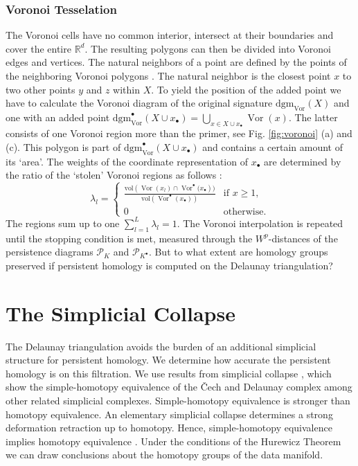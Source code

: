 \documentclass[runningheads]{llncs}
\DeclareMathOperator{\Vor}{\text{Vor}}
\begin{document}
\subsubsection{Voronoi Tesselation}
The Voronoi cells have no common interior, intersect at their boundaries and cover the entire $\mathbb{R}^d$. The resulting polygons can then be divided into Voronoi edges and vertices. The natural neighbors of a point are defined by the points of the neighboring Voronoi polygons \cite{Sibson}. The natural neighbor is the closest point $x$ to two other points $y$ and $z$ within $X$. To yield the position of the added point we have to calculate the Voronoi diagram of the original signature $\text{dgm}_{\Vor}(X)$ and one with an added point $\text{dgm}_{\Vor}^{\bullet}(X\cup x_{\bullet}) = \bigcup_{x \in X \cup x_\bullet} \Vor(x)$. The latter consists of one Voronoi region more than the primer, see Fig. \ref{fig:voronoi} (a) and (c). This polygon is part of $\text{dgm}_{\Vor}^{\bullet}(X\cup x_{\bullet})$ and contains a certain amount of its `area'. The weights of the coordinate representation of $x_{\bullet}$ are determined by the ratio of the `stolen' Voronoi regions as follows \cite{Anton2001}:
\begin{equation}
    \lambda_{l} =
    \begin{cases}
        \frac{\text{vol}\left(\Vor(x_l) \cap \Vor^{\bullet}(x_{\bullet}\right))}{\text{vol}\left(\Vor^{\bullet}(x_{\bullet})\right)} & \text{if } x\geq 1,\\
        0 & \text{otherwise.}
    \end{cases}
\end{equation}
The regions sum up to one $\sum_{l=1}^{L} \lambda_l = 1$. The Voronoi interpolation is repeated until the stopping condition is met, measured through the $W^p$-distances of the persistence diagrams $\mathcal{P}_{K}$ and $\mathcal{P}_{K^\bullet}$. But to what extent are homology groups preserved if persistent homology is computed on the Delaunay triangulation?

\section{The Simplicial Collapse}
\label{simcoll}
The Delaunay triangulation avoids the burden of an additional simplicial structure for persistent homology. We determine how accurate the persistent homology is on this filtration. We use results from simplicial collapse \cite{bauer2017morse}, which show the simple-homotopy equivalence of the \v{C}ech and Delaunay complex among other related simplicial complexes. Simple-homotopy equivalence is stronger than homotopy equivalence. An elementary simplicial collapse determines a strong deformation retraction up to homotopy. Hence, simple-homotopy equivalence implies homotopy equivalence \cite[§2]{cohen2012course}. Under the conditions of the Hurewicz Theorem we can draw conclusions about the homotopy groups of the data manifold.
\end{document}
